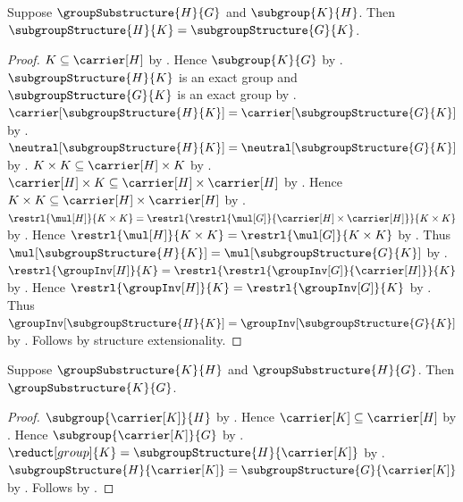 \begin{theorem}\label{subgroup_structure_through_group_substructure}
    Suppose $\groupSubstructure{H}{G}$ and $\subgroup{K}{H}$.
    Then
        $\subgroupStructure{H}{K}=\subgroupStructure{G}{K}$.
\end{theorem}
\begin{proof}
    $K\subseteq\carrier[H]$ by .
    Hence $\subgroup{K}{G}$ by
        .
    $\subgroupStructure{H}{K}$ is an exact group and
        $\subgroupStructure{G}{K}$ is an exact group by
        .
    $\carrier[\subgroupStructure{H}{K}]
        =\carrier[\subgroupStructure{G}{K}]$ by
        .
    $\neutral[\subgroupStructure{H}{K}]
        =\neutral[\subgroupStructure{G}{K}]$ by
        .
    $K\times K\subseteq\carrier[H]\times K$ by
        .
    $\carrier[H]\times K
        \subseteq\carrier[H]\times\carrier[H]$ by
        .
    Hence
        $K\times K
            \subseteq\carrier[H]\times\carrier[H]$ by
        .
    $\restrl{\mul[H]}{K\times K}
        =\restrl{
            \restrl{\mul[G]}
                {\carrier[H]\times\carrier[H]}}
            {K\times K}$ by
        .
    Hence
        $\restrl{\mul[H]}{K\times K}
            =\restrl{\mul[G]}{K\times K}$ by
        .
    Thus
        $\mul[\subgroupStructure{H}{K}]
            =\mul[\subgroupStructure{G}{K}]$ by
        .
    $\restrl{\groupInv[H]}{K}
        =\restrl{\restrl{\groupInv[G]}{\carrier[H]}}{K}$ by
        .
    Hence
        $\restrl{\groupInv[H]}{K}
            =\restrl{\groupInv[G]}{K}$ by
        .
    Thus
        $\groupInv[\subgroupStructure{H}{K}]
            =\groupInv[\subgroupStructure{G}{K}]$ by
        .
    Follows by structure extensionality.
\end{proof}

\begin{theorem}\label{group_substructure_transitive}
    Suppose $\groupSubstructure{K}{H}$ and
        $\groupSubstructure{H}{G}$.
    Then $\groupSubstructure{K}{G}$.
\end{theorem}
\begin{proof}
    $\subgroup{\carrier[K]}{H}$ by
        .
    Hence $\carrier[K]\subseteq\carrier[H]$ by
        .
    Hence $\subgroup{\carrier[K]}{G}$ by
        .
    $\reduct[group]{K}
        =\subgroupStructure{H}{\carrier[K]}$ by
        .
    $\subgroupStructure{H}{\carrier[K]}
        =\subgroupStructure{G}{\carrier[K]}$ by
        .
    Follows by .
\end{proof}

